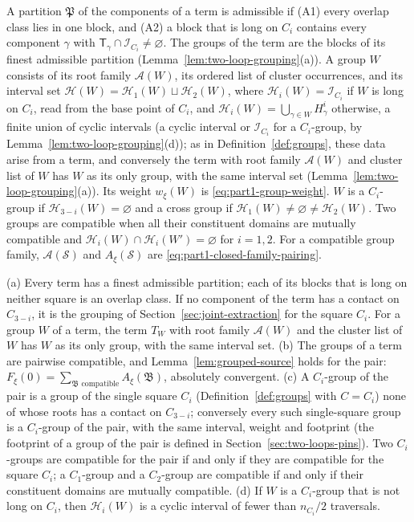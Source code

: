 \begin{definition}\label{def:two-loop-groups}
A partition $\mathfrak P$ of the components of a term is admissible if (A1) every overlap class lies in one block, and (A2) a block that is long on $C_i$ contains every component $\gamma$ with $\mathsf T_\gamma\cap\mathcal I_{C_i}\neq\varnothing$. The groups of the term are the blocks of its finest admissible partition (Lemma~\ref{lem:two-loop-grouping}(a)). A group $W$ consists of its root family $\mathcal A(W)$, its ordered list of cluster occurrences, and its interval set $\mathcal H(W)=\mathcal H_1(W)\sqcup\mathcal H_2(W)$, where $\mathcal H_i(W)=\mathcal I_{C_i}$ if $W$ is long on $C_i$, read from the base point of $C_i$, and $\mathcal H_i(W)=\bigcup_{\gamma\in W}H^i_\gamma$ otherwise, a finite union of cyclic intervals (a cyclic interval or $\mathcal I_{C_i}$ for a $C_i$-group, by Lemma~\ref{lem:two-loop-grouping}(d)); as in Definition~\ref{def:groups}, these data arise from a term, and conversely the term with root family $\mathcal A(W)$ and cluster list of $W$ has $W$ as its only group, with the same interval set (Lemma~\ref{lem:two-loop-grouping}(a)). Its weight $w_\xi(W)$ is \eqref{eq:part1-group-weight}. $W$ is a $C_i$-group if $\mathcal H_{3-i}(W)=\varnothing$ and a cross group if $\mathcal H_1(W)\neq\varnothing\neq\mathcal H_2(W)$. Two groups are compatible when all their constituent domains are mutually compatible and $\mathcal H_i(W)\cap\mathcal H_i(W')=\varnothing$ for $i=1,2$. For a compatible group family, $\mathcal A(\mathcal S)$ and $A_\xi(\mathcal S)$ are \eqref{eq:part1-closed-family-pairing}.
\end{definition}

\begin{lemma}\label{lem:two-loop-grouping}
(a) Every term has a finest admissible partition; each of its blocks that is long on neither square is an overlap class. If no component of the term has a contact on $C_{3-i}$, it is the grouping of Section~\ref{sec:joint-extraction} for the square $C_i$. For a group $W$ of a term, the term $T_W$ with root family $\mathcal A(W)$ and the cluster list of $W$ has $W$ as its only group, with the same interval set. (b) The groups of a term are pairwise compatible, and Lemma~\ref{lem:grouped-source} holds for the pair: $F_\xi(0)=\sum_{\mathfrak B\text{ compatible}}A_\xi(\mathfrak B)$, absolutely convergent. (c) A $C_i$-group of the pair is a group of the single square $C_i$ (Definition~\ref{def:groups} with $C=C_i$) none of whose roots has a contact on $C_{3-i}$; conversely every such single-square group is a $C_i$-group of the pair, with the same interval, weight and footprint (the footprint of a group of the pair is defined in Section~\ref{sec:two-loops-pins}). Two $C_i$-groups are compatible for the pair if and only if they are compatible for the square $C_i$; a $C_1$-group and a $C_2$-group are compatible if and only if their constituent domains are mutually compatible. (d) If $W$ is a $C_i$-group that is not long on $C_i$, then $\mathcal H_i(W)$ is a cyclic interval of fewer than $n_{C_i}/2$ traversals.
\end{lemma}

